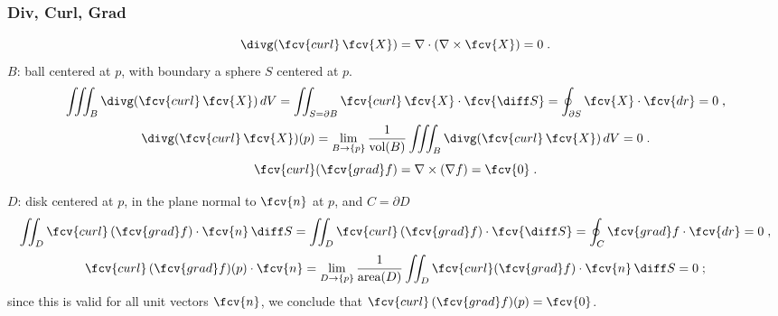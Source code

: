 \begin{frame}
  \frametitle{Div, Curl, Grad}

$$\divg (\fcv{curl} \, \fcv{X})  = \nabla \cdot (\nabla \times \fcv{X}) = 0 \; .$$
%
\pause $B$: ball centered at $p$, with boundary a sphere $S$ centered at $p$.
%
$$\iiint_B \divg (\fcv{curl}\,\fcv{X}) \, dV = \iint_{S=\partial B} \fcv{curl}\, \fcv{X} \cdot \fcv{\diff S} = \oint_{\partial S} \fcv{X} \cdot \fcv{dr} = 0\; ,$$
%
$$\divg (\fcv{curl}\, \fcv{X}) (p) = \lim_{B \to \{p\}} \frac{1}{\text{vol}(B)} \iiint_B \divg (\fcv{curl}\, \fcv{X}) \, dV = 0\; .$$
\pause
%
$$\fcv{curl} ( \fcv{grad} f ) = \nabla \times (\nabla f) = \fcv{0}\; .$$

\pause $D$: disk centered at $p$, in the plane normal to $\fcv{n}$ at $p$, and $C=\partial D$
%
$$\iint_D \fcv{curl} \,(\fcv{grad} f) \cdot \fcv{n}\, \diff S = \iint_D \fcv{curl}\, (\fcv{grad} f) \cdot \fcv{\diff S} = \oint_C \fcv{grad} f \cdot \fcv{dr} = 0\; ,$$
%
$$\fcv{curl} \,(\fcv{grad} f) (p) \cdot \fcv{n} = \lim_{D\to \{p\}} \frac{1}{\text{area}(D)} \iint_D \fcv{curl} (\fcv{grad} f) \cdot \fcv{n}\, \diff S = 0\; ; $$
%
since this is valid for all unit vectors $\fcv{n}$, we conclude that $\fcv{curl} \,(\fcv{grad} f) (p)= \fcv{0}$.
\end{frame}